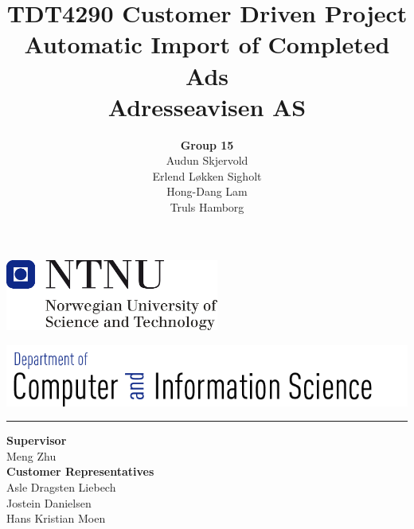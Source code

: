 \documentclass[12pt, a4paper]{article}
\title{\normalsize TDT4290 Customer Driven Project \\ \LARGE \textbf{Automatic Import of Completed Ads} \normalsize \\Adresseavisen AS}
\author{\Large \textbf{Group 15} \normalsize\\Audun Skjervold \\ Erlend Løkken Sigholt \\ Hong-Dang Lam \\ Truls Hamborg}
\begin{document}
\maketitle \hspace{-0.5cm}
\begin{center}
\includegraphics[width=7cm]{images/ntnulogo}\\ 
\end{center}
\includegraphics[width=17cm]{images/idilogo}\\\hrule

\begin{center}
\textbf{Supervisor}\\ Meng Zhu\\
\textbf{Customer Representatives}\\ Asle Dragsten Liebech \\
Jostein Danielsen\\
Hans Kristian Moen\\
\end{center}
\thispagestyle{empty}
\newpage




\tableofcontents
\newpage

\listoffigures
\newpage

\listoftables
\newpage






%





\end{document}
